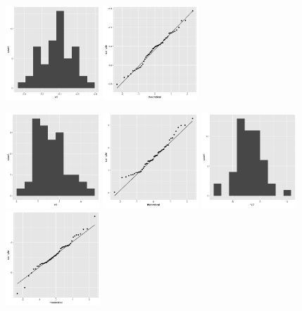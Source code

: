 \begin{enumerate}
\begin{center}
	\includegraphics[width=1.4in]{II_2_V2_hist.png}
	\includegraphics[width=1.4in]{II_2_V2_qq.png}
\end{center}
\begin{center}
	\includegraphics[width=1.4in]{II_3_V1_hist.png}
	\includegraphics[width=1.4in]{II_3_V1_qq.png}
	\includegraphics[width=1.4in]{II_3_V2_hist.png}
	\includegraphics[width=1.4in]{II_3_V2_qq.png}
\end{center}


\end{enumerate}
